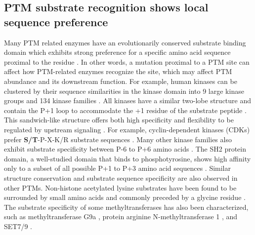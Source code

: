 \subsection{PTM substrate recognition shows local sequence preference}
Many PTM related enzymes have an evolutionarily conserved substrate binding domain which exhibits strong preference for a specific amino acid sequence proximal to the residue \cite{manningg_sudarsanams:ProteinKinase2002, taylorss_kornevap:ProteinKinases2011,endicottja_johnsonln:StructuralBasis2012,chenmj_manningg:GenomicsEvolution2017,ochoad_beltraop:EvolutionDynamics2018,alii_ottm:LysineAcetylation2018}. In other words, a mutation proximal to a PTM site can affect how PTM-related enzymes recognize the site, which may affect PTM abundance and its downstream function. For example, human kinases can be clustered by their sequence similarities in the kinase domain into 9 large kinase groups and 134 kinase families \cite{manningg_sudarsanams:ProteinKinase2002}. All kinases have a similar two-lobe structure and contain the P+1 loop to accommodate the +1 residue of the substrate peptide \cite{taylorss_kornevap:ProteinKinases2011}. This sandwich-like structure offers both high specificity and flexibility to be regulated by upstream signaling \cite{taylorss_kornevap:ProteinKinases2011}. For example, cyclin-dependent kinases (CDKs) prefer \textbf{S/T}-P-X-K/R substrate sequences \cite{endicottja_johnsonln:StructuralBasis2012,ochoad_beltraop:EvolutionDynamics2018}. Many other kinase families also exhibit substrate specificity between P-6 to P+6 amino acids \cite{hornbeckpv_skrzypeke:PhosphoSitePlus2015}. The SH2 protein domain, a well-studied domain that binds to phosphotyrosine, shows high affinity only to a subset of all possible P+1 to P+3 amino acid sequences \cite{zhous_cantleylc:SH2Domains1993}. Similar structure conservation and substrate sequence specificity are also observed in other PTMs. Non-histone acetylated lysine substrates have been found to be surrounded by small amino acids and commonly preceded by a glycine residue \cite{basua_hakesb:ProteomewidePrediction2009,schwartzd_churchgm:PredictingProtein2009}. The substrate specificity of some methyltransferases has also been characterized, such as methyltransferase G9a \cite{rathertp_jeltscha:ProteinLysine2008,hameyjj_wilkinsmr:MTMAMSProtein2018}, protein arginine N-methyltransferase 1 \cite{hameyjj_wilkinsmr:MTMAMSProtein2018}, and SET7/9 \cite{dhayalana_jeltscha:SpecificityAnalysisbased2011}.

